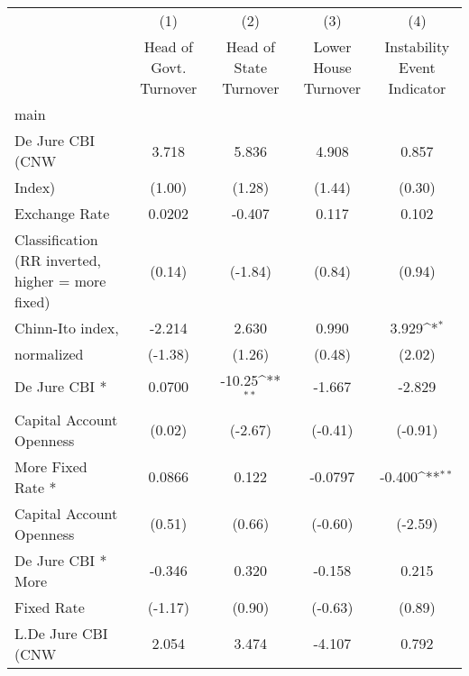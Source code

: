 {
\def\sym#1{\ifmmode^{#1}\else\(^{#1}\)\fi}
\begin{tabular}{l*{4}{c}}
\hline\hline
                    &\multicolumn{1}{c}{(1)}&\multicolumn{1}{c}{(2)}&\multicolumn{1}{c}{(3)}&\multicolumn{1}{c}{(4)}\\
                    &\multicolumn{1}{c}{Head of Govt. Turnover}&\multicolumn{1}{c}{Head of State Turnover}&\multicolumn{1}{c}{Lower House Turnover}&\multicolumn{1}{c}{Instability Event Indicator}\\
\hline
main                &                     &                     &                     &                     \\
De Jure CBI (CNW    &       3.718         &       5.836         &       4.908         &       0.857         \\
Index)              &      (1.00)         &      (1.28)         &      (1.44)         &      (0.30)         \\
[1em]
Exchange Rate       &      0.0202         &      -0.407         &       0.117         &       0.102         \\
Classification (RR inverted, higher = more fixed)&      (0.14)         &     (-1.84)         &      (0.84)         &      (0.94)         \\
[1em]
Chinn-Ito index,    &      -2.214         &       2.630         &       0.990         &       3.929\sym{*}  \\
normalized          &     (-1.38)         &      (1.26)         &      (0.48)         &      (2.02)         \\
[1em]
De Jure CBI *       &      0.0700         &      -10.25\sym{**} &      -1.667         &      -2.829         \\
Capital Account Openness&      (0.02)         &     (-2.67)         &     (-0.41)         &     (-0.91)         \\
[1em]
More Fixed Rate *   &      0.0866         &       0.122         &     -0.0797         &      -0.400\sym{**} \\
Capital Account Openness&      (0.51)         &      (0.66)         &     (-0.60)         &     (-2.59)         \\
[1em]
De Jure CBI * More  &      -0.346         &       0.320         &      -0.158         &       0.215         \\
Fixed Rate          &     (-1.17)         &      (0.90)         &     (-0.63)         &      (0.89)         \\
[1em]
L.De Jure CBI (CNW  &       2.054         &       3.474         &      -4.107         &       0.792         \\

\end{tabular}}
